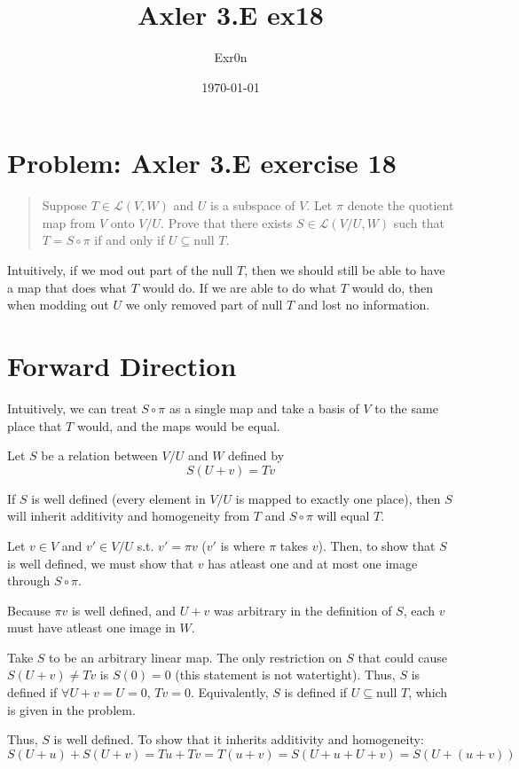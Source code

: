 \documentclass[letterpaper]{article}
\author{Exr0n}
\date{\today}
\title{Axler 3.E ex18}
\renewcommand{\tableofcontents}{}
\begin{document}
\tableofcontents

\section{Problem: Axler 3.E exercise 18}
\label{sec:org29639c7}
\begin{quote}
Suppose \(T \in \mathcal L(V, W)\) and \(U\) is a subspace of \(V\). Let \(\pi\) denote the quotient map from \(V\) onto \(V/U\). Prove that there exists \(S \in \mathcal L(V/U, W)\) such that \(T = S \circ \pi\) if and only if \(U \subseteq \text{null }T\).
\end{quote}
Intuitively, if we mod out part of the \(\text{null }T\), then we should still be able to have a map that does what \(T\) would do. If we are able to do what \(T\) would do, then when modding out \(U\) we only removed part of \(\text{null }T\) and lost no information.

\section{Forward Direction}
\label{sec:org79ac384}

Intuitively, we can treat \(S \circ \pi\) as a single map and take a basis of \(V\) to the same place that \(T\) would, and the maps would be equal.

Let \(S\) be a relation between \(V/U\) and \(W\) defined by
\[ S(U+v) = Tv \]

If \(S\) is well defined (every element in \(V/U\) is mapped to exactly one place), then \(S\) will inherit additivity and homogeneity from \(T\) and \(S \circ \pi\) will equal \(T\).

Let \(v \in V\) and \(v' \in V/U\) s.t. \(v' = \pi v\) (\(v'\) is where \(\pi\) takes \(v\)). Then, to show that \(S\) is well defined, we must show that \(v\) has atleast one and at most one image through \(S \circ \pi\).

Because \(\pi v\) is well defined, and \(U+v\) was arbitrary in the definition of \(S\), each \(v\) must have atleast one image in \(W\).

Take \(S\) to be an arbitrary linear map. The only restriction on \(S\) that could cause \(S(U+v) \neq Tv\) is \(S(0) = 0\) (this statement is not watertight).
Thus, \(S\) is defined if \(\forall U+v = U = 0\), \(Tv = 0\). Equivalently, \(S\) is defined if \(U \subseteq \text{null }T\), which is given in the problem.

Thus, \(S\) is well defined. To show that it inherits additivity and homogeneity:
\[ S(U+u) + S(U+v) = Tu + Tv = T(u+v) = S(U+u + U+v) = S(U+(u+v)) \]
\end{document}
